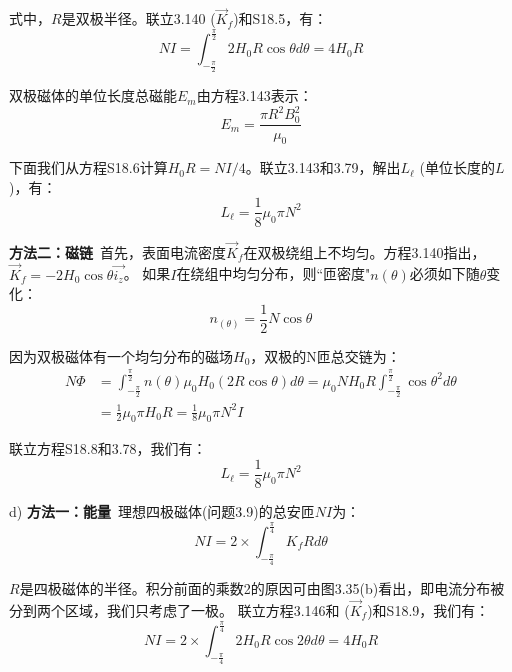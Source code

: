 式中，$R$是双极半径。联立3.140 ($\vec{K}_f$)和S18.5，有：
\begin{equation*}%
NI=\int_{-\frac{\pi}{2}}^{\frac{\pi}{2}}2H_0R\cos\theta d\theta=4H_0R \tag{S18.6}
\end{equation*}

双极磁体的单位长度总磁能$E_m$由方程3.143表示：
 \begin{equation*}%
E_m=\frac{\pi R^2B_{0}^{2}}{\mu_0} \tag{3.143}
\end{equation*}

下面我们从方程S18.6计算$H_0R=NI/4$。联立3.143和3.79，解出$L_\ell$ (单位长度的$L$)，有：
 \begin{equation*}%
L_\ell=\frac{1}{8}\mu_0\pi N^2 \tag{3.87}
\end{equation*}

\textbf{方法二：磁链}\ 首先，表面电流密度$\vec{K}_f$在双极绕组上不均匀。方程3.140指出，$\vec{K}_f=-2H_0\cos\theta\vec{i_z}$。
如果$I$在绕组中均匀分布，则``匝密度"$n(\theta)$必须如下随$\theta$变化：
\begin{equation*}%
n_(\theta)=\frac{1}{2}N\cos\theta \tag{S18.7}
\end{equation*}

因为双极磁体有一个均匀分布的磁场$H_0$，双极的N匝总交链为：
\begin{align*}%
N\Phi&=\int_{-\frac{\pi}{2}}^{\frac{\pi}{2}}n(\theta)\mu_0H_0(2R\cos\theta)d\theta=
\mu_0NH_0R\int_{-\frac{\pi}{2}}^{\frac{\pi}{2}}\cos\theta^2d\theta \\
&=\frac{1}{2}\mu_0\pi H_0 R=\frac{1}{8}\mu_0\pi N^2I \tag{S18.8}
\end{align*}

联立方程S18.8和3.78，我们有：
 \begin{equation*}%
L_\ell=\frac{1}{8}\mu_0\pi N^2 \tag{3.78}
\end{equation*}

d) \textbf{方法一：能量}\ 理想四极磁体(问题3.9)的总安匝$NI$为：
\begin{equation*}%
NI=2\times\int_{-\frac{\pi}{4}}^{\frac{\pi}{4}}K_fRd\theta \tag{S18.9}
\end{equation*}

$R$是四极磁体的半径。积分前面的乘数2的原因可由图3.35(b)看出，即电流分布被分到两个区域，我们只考虑了一极。
联立方程3.146和 ($\vec{K}_f$)和S18.9，我们有：
 \begin{equation*}%
NI=2\times\int_{-\frac{\pi}{4}}^{\frac{\pi}{4}}2H_0R\cos 2\theta d\theta=4H_0R \tag{S18.10}
\end{equation*}


